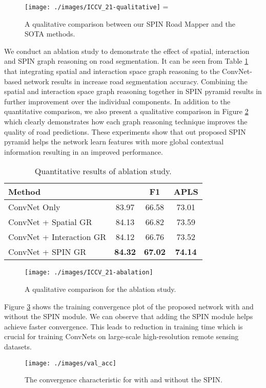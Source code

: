 \documentclass[letterpaper, 10 pt, conference]{ieeeconf}
\begin{document}
\begin{figure}[tb]
	\centering
	\texttt{[image: ./images/ICCV\_21-qualitative]}
    \vskip-20pt	=
    \caption{A qualitative comparison between our SPIN Road Mapper and the SOTA methods. 
}
	\label{qualitative_results}
	\vspace{-5mm}
\end{figure}
 We conduct an ablation study to demonstrate the effect of spatial, interaction and SPIN graph reasoning on road segmentation. It can be seen from Table \ref{Abalation_study_GR} that integrating spatial and interaction space graph reasoning to the ConvNet-based network results in increase road segmentation accuracy. Combining the spatial and interaction space graph reasoning together in SPIN pyramid results in further improvement over the individual components. In addition to the quantitative comparison, we also present a qualitative comparison in Figure \ref{abalation_qualitative} which clearly demonstrates how each graph reasoning technique improves the quality of road predictions. These experiments show that out proposed SPIN pyramid helps the network learn features with more global contextual information resulting in an improved performance.

\begin{table}[tb]
	\centering
	\caption{Quantitative results of ablation study.}
	\vskip-10pt
	\begin{tabular}{lccc} \toprule
		Method & {} & {F1} & APLS  \\
		\midrule
		ConvNet Only 	            & 83.97 & 66.58 & 73.01\\
		ConvNet + Spatial GR        & 84.13	& 66.82 & 73.59\\
		ConvNet + Interaction GR    & 84.12 & 66.76 & 73.52\\
		ConvNet + SPIN GR           & \textbf{84.32} & \textbf{67.02} & \textbf{74.14}\\
		\bottomrule
	\end{tabular}
	\label{Abalation_study_GR}
\end{table}
\begin{figure}[tb]
	\centering
	\texttt{[image: ./images/ICCV\_21-abalation]}
    \vskip-10pt
    \caption{A qualitative comparison for the ablation study.
}
	\label{abalation_qualitative}
\end{figure}
 Figure \ref{convergence} shows the training convergence plot of the proposed network with and without the SPIN module. We can observe that adding the SPIN module helps achieve faster convergence. This leads to reduction in training time which is crucial for training ConvNets on large-scale high-resolution remote sensing datasets.
\begin{figure}[tb!]
	\vspace{-9pt}
	\centering
	\texttt{[image: ./images/val\_acc]}
    \vskip-10pt	
    \caption{The convergence characteristic for with and without the SPIN.}
	\label{convergence}
	\vspace{-5mm}
\end{figure}
\end{document}
